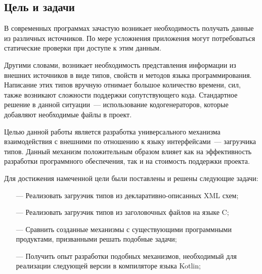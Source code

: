 \subsection{Цель и задачи}\label{tasks}

В современных программах зачастую возникает необходимость получать данные из различных источников.
По мере усложнения приложения могут потребоваться статические проверки при доступе к этим данным.

Другими словами, возникает необходимость представления информации из внешних источников в виде типов, свойств и методов языка программирования.
Написание этих типов вручную отнимает большое количество времени, сил, также возникают сложности поддержки сопутствующего кода.
Стандартное решение в данной ситуации~--- использование кодогенераторов, которые добавляют необходимые файлы в проект.

Целью данной работы является разработка универсального механизма взаимодействия с внешними по отношению к языку интерфейсами~--- загрузчика типов.
Данный механизм положительным образом влияет как на эффективность разработки программного обеспечения, так и на стоимость поддержки проекта.

Для достижения намеченной цели были поставлены и решены следующие задачи:
\begin{itemize}
\item[---] Реализовать загрузчик типов из декларативно-описанных XML схем;
\item[---] Реализовать загрузчик типов из заголовочных файлов на языке C;
\item[---] Сравнить созданные механизмы с существующими программными продуктами, призванными решать подобные задачи;
\item[---] Получить опыт разработки подобных механизмов, необходимый для реализации следующей версии в компиляторе языка Kotlin;
\end{itemize}